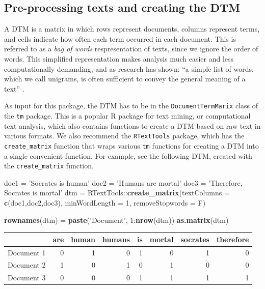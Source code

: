 \documentclass[]{article}
\newenvironment{Shaded}{\begin{snugshade}}{\end{snugshade}}
\newcommand{\KeywordTok}[1]{\textcolor[rgb]{0.13,0.29,0.53}{\textbf{{#1}}}}
\newcommand{\DataTypeTok}[1]{\textcolor[rgb]{0.13,0.29,0.53}{{#1}}}
\newcommand{\DecValTok}[1]{\textcolor[rgb]{0.00,0.00,0.81}{{#1}}}
\newcommand{\StringTok}[1]{\textcolor[rgb]{0.31,0.60,0.02}{{#1}}}
\newcommand{\NormalTok}[1]{{#1}}
\begin{document}
\subsection{Pre-processing texts and creating the
DTM}\label{pre-processing-texts-and-creating-the-dtm}

A DTM is a matrix in which rows represent documents, columns represent
terms, and cells indicate how often each term occurred in each document.
This is referred to as a \emph{bag of words} respresentation of texts,
since we ignore the order of words. This simplified representation makes
analysis much easier and less computationally demanding, and as research
has shown: ``a simple list of words, which we call unigrams, is often
sufficient to convey the general meaning of a text''
\citep[6]{grimmer13}.

As input for this package, the DTM has to be in the
\texttt{DocumentTermMarix} class of the \texttt{tm} package. This is a
popular R package for text mining, or computational text analysis, which
also contains functions to create a DTM based on raw text in various
formats. We also recommend the \texttt{RTextTools} package, which has
the \texttt{create\_matrix} function that wraps various \texttt{tm}
functions for creating a DTM into a single convenient function. For
example, see the following DTM, created with the \texttt{create\_matrix}
function.

\begin{Shaded}
\begin{Highlighting}[]
\NormalTok{doc1 =}\StringTok{ 'Socrates is human'}
\NormalTok{doc2 =}\StringTok{ 'Humans are mortal'}
\NormalTok{doc3 =}\StringTok{ 'Therefore, Socrates is mortal'}
\NormalTok{dtm =}\StringTok{ }\NormalTok{RTextTools::}\KeywordTok{create_matrix}\NormalTok{(}\DataTypeTok{textColumns =} \KeywordTok{c}\NormalTok{(doc1,doc2,doc3), }
                                \DataTypeTok{minWordLength =} \DecValTok{1}\NormalTok{, }\DataTypeTok{removeStopwords =} \NormalTok{F)}

\KeywordTok{rownames}\NormalTok{(dtm) =}\StringTok{ }\KeywordTok{paste}\NormalTok{(}\StringTok{'Document'}\NormalTok{, }\DecValTok{1}\NormalTok{:}\KeywordTok{nrow}\NormalTok{(dtm))}
\KeywordTok{as.matrix}\NormalTok{(dtm)}
\end{Highlighting}
\end{Shaded}

\begin{longtable}[c]{@{}lrrrrrrr@{}}
\toprule
& are & human & humans & is & mortal & socrates &
therefore\tabularnewline
\midrule
\endhead
Document 1 & 0 & 1 & 0 & 1 & 0 & 1 & 0\tabularnewline
Document 2 & 1 & 0 & 1 & 0 & 1 & 0 & 0\tabularnewline
Document 3 & 0 & 0 & 0 & 1 & 1 & 1 & 1\tabularnewline
\bottomrule
\end{longtable}
\end{document}
